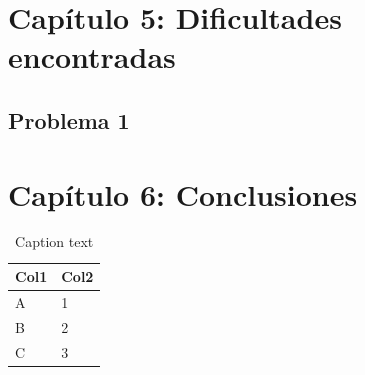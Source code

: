 \chapter{Cap\'itulo 5: Dificultades encontradas}
\section{Problema 1} 

 
\chapter{Cap\'itulo 6: Conclusiones}



\begin{table}[H]
\centering
\begin{tabular}{|p{1.0in}|p{3.2in}|} \hline 
\textbf{Col1} & \textbf{Col2} \\ \hline 
A & 1 \\ \hline 
B & 2 \\ \hline 
C & 3 \\ \hline 
\end{tabular}

\caption[Lo que aparecerá en el listado ]{Caption text}
\label{table:name}
\end{table}

 

